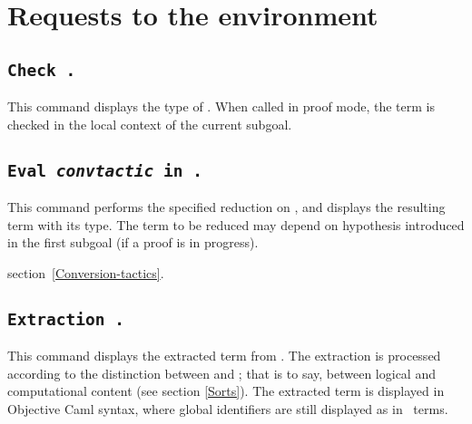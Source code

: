 
\section{Requests to the environment}

\subsection{\tt Check {\term}.}
\label{Check}
This command displays the type of {\term}. When called in proof mode, 
the term is checked in the local context of the current subgoal.

\subsection{\tt Eval {\rm\sl convtactic} in {\term}.}

This command performs the specified reduction on {\term}, and displays
the resulting term with its type. The term to be reduced may depend on
hypothesis introduced in the first subgoal (if a proof is in
progress).

\SeeAlso section~\ref{Conversion-tactics}.

\subsection{\tt Extraction \term.}
\label{ExtractionTerm}
This command displays the extracted term from
{\term}. The extraction is processed according to the distinction
between {\Set} and {\Prop}; that is to say, between logical and
computational content (see section \ref{Sorts}). The extracted term is
displayed in Objective Caml syntax, where global identifiers are still
displayed as in \Coq\ terms.

